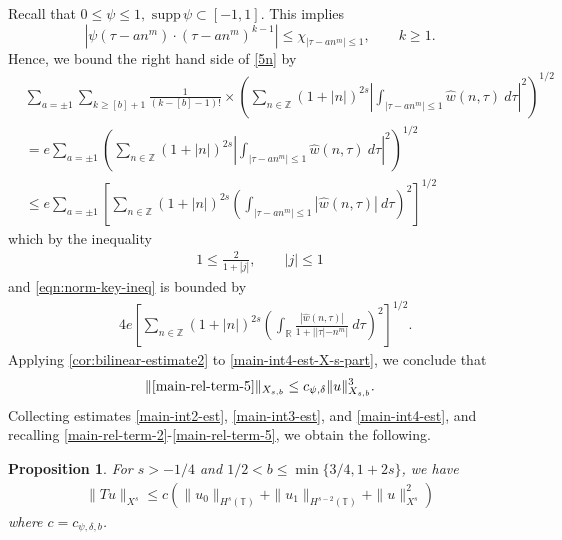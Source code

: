 \documentclass[12pt,reqno]{amsart}
\numberwithin{equation}{section}  %
\newcommand{\rr}{\mathbb{R}}
\newcommand{\zz}{\mathbb{Z}}
\newcommand{\ci}{\mathbb{T}}
\newcommand{\wh}{\widehat}
\newtheorem{proposition}[theorem]{Proposition}
\begin{document}
%
Recall that $0 \le \psi \le 1, \text{ supp} \, \psi \subset [-1,1 ]$. 
This implies $$| \psi\left( \tau - an^{m } \right) \cdot \left( \tau - an^{m }
\right)^{k -1} | \le \chi_{| \tau - an^{m } | \le 1}, \qquad k \ge 1.$$ Hence,
we bound the right hand side of \eqref{5n} by
%
\begin{equation*}
	\begin{split}
    & \sum_{a = \pm 1}
    \sum_{k \ge [b] +1} \frac{1}{(k-[b] - 1)!}
    \times \left( \sum_{n \in \zz} (1 + | n |)^{2s}| 
		\int_{| \tau - an^{m}  |\le 1}  \wh{w}(n, \tau) \ d \tau |^2 
		\right)^{1/2}
    \\
    & = e \sum_{a = \pm 1} \left( \sum_{n \in \zz} (1 + | n |)^{2s}| 
		\int_{| \tau - an^{m}  |\le 1}  \wh{w}(n, \tau) \ d \tau |^2 
		\right)^{1/2}
    \\
    & \le e \sum_{a = \pm 1}
\left[ \sum_{n \in \zz} (1 + | n |)^{2s}\left (  
		\int_{| \tau - an^{m}  |\le 1} | \wh{w}(n, \tau) | \ d \tau \right ) ^2 
		\right]^{1/2}
	\end{split}
\end{equation*}
%
which by the inequality
%
\begin{equation*}
	\begin{split}
		1 \le 
		\frac{2}{1 + | j |}, \qquad | j | \le 1
	\end{split}
\end{equation*}
%
and \eqref{eqn:norm-key-ineq}
is bounded by 
%
\begin{equation}
\label{main-int4-est-X-s-part}
	\begin{split}
		& 4e \left[ \sum_{n \in \zz} (1 + | n |)^{2s}\left ( \int_\rr
		\frac{|\wh{w}(n, \tau)|}{1 + | |\tau| - n^{m } |} \ d \tau \right ) ^2 
		\right]^{1/2}.
  \end{split}
\end{equation}
%
Applying \cref{cor:bilinear-estimate2} to \eqref{main-int4-est-X-s-part}, we
conclude that
%
%
\begin{equation}
\label{main-int4-est}
	\begin{split}
    \|\eqref{main-rel-term-5}\|_{X_{s,b}} \le c_{\psi, \delta} \|u\|_{X_{s,b}}^{3}.
	\end{split}
\end{equation}
%
%
Collecting estimates \eqref{main-int2-est}, 
\eqref{main-int3-est}, and \eqref{main-int4-est}, and recalling 
\eqref{main-rel-term-2}-\eqref{main-rel-term-5}, we obtain the following. 
%
%
\begin{proposition}
\label{prop:contraction}
For $s > -1/4$ and  $1/2 < b \le \min \{ 3/4, 1 + 2s \}$, we have 
%
\begin{equation*}
	\begin{split}
    \|Tu\|_{X^{s}} \le c
    \left( \|u_0 \|_{H^s(\ci)} + \|u_1 \|_{H^{s-2}(\ci)}
    + \|u\|_{X^{s}}^2 
		\right)
	\end{split}
\end{equation*}
%
where $c = c_{\psi, \delta, b}$.  
\end{proposition}
%
\end{document}

